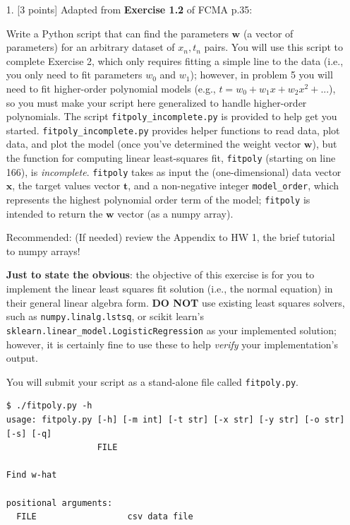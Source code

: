 \documentclass[10pt]{article}
\begin{document}
\newpage
\begin{itemize}



\item[1.] [3 points]
Adapted from {\bf Exercise 1.2} of FCMA p.35:

Write a Python script that can find the parameters $\mathbf{w}$ (a vector of parameters) for an arbitrary dataset of $x_n, t_n$ pairs.  You will use this script to complete Exercise 2, which only requires fitting a simple line to the data (i.e., you only need to fit parameters $w_0$ and $w_1$); however, in problem 5 you will need to fit higher-order polynomial models (e.g., $t = w_0 + w_1x + w_2x^2 + ...$), so you must make your script here generalized to handle higher-order polynomials.  The script {\tt fitpoly\_incomplete.py} is provided to help get you started.  {\tt fitpoly\_incomplete.py} provides helper functions to read data, plot data, and plot the model (once you've determined the weight vector $\mathbf{w}$), but the function for computing linear least-squares fit, {\tt fitpoly} (starting on line 166), is {\em incomplete}.  {\tt fitpoly} takes as input the (one-dimensional) data vector $\mathbf{x}$, the target values vector $\mathbf{t}$, and a non-negative integer {\tt model\_order}, which represents the highest polynomial order term of the model; {\tt fitpoly} is intended to return the $\mathbf{w}$ vector (as a numpy array).

Recommended: (If needed) review the Appendix to HW 1, the brief tutorial to numpy arrays!

{\bf Just to state the obvious}: the objective of this exercise is for you to implement the linear least squares fit solution (i.e., the normal equation) in their general linear algebra form.  {\bf DO NOT} use existing least squares solvers, such as {\tt numpy.linalg.lstsq}, or scikit learn's \\{\tt sklearn.linear\_model.LogisticRegression} as your implemented solution; however, it is certainly fine to use these to help {\em verify} your implementation's output.

You will submit your script as a stand-alone file called {\tt fitpoly.py}.

\begin{verbatim}
$ ./fitpoly.py -h
usage: fitpoly.py [-h] [-m int] [-t str] [-x str] [-y str] [-o str] [-s] [-q]
                  FILE

Find w-hat

positional arguments:
  FILE                  csv data file


\end{verbatim}
\end{itemize}
\end{document}
